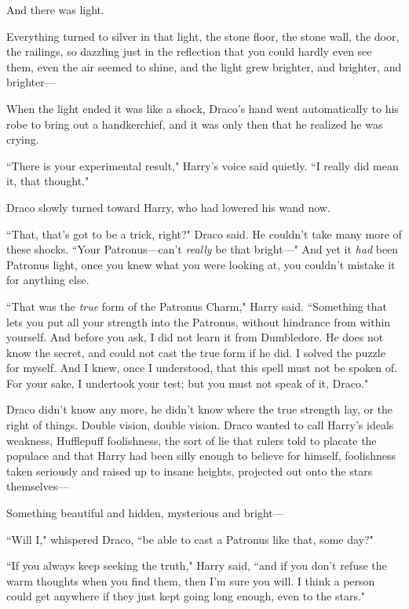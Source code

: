 And there was light.

Everything turned to silver in that light, the stone floor, the stone wall, the door, the railings, so dazzling just in the reflection that you could hardly even see them, even the air seemed to shine, and the light grew brighter, and brighter, and brighter—

When the light ended it was like a shock, Draco's hand went automatically to his robe to bring out a handkerchief, and it was only then that he realized he was crying.

``There is your experimental result," Harry's voice said quietly. ``I really did mean it, that thought."

Draco slowly turned toward Harry, who had lowered his wand now.

``That, that's got to be a trick, right?" Draco said. He couldn't take many more of these shocks. ``Your Patronus—can't \emph{really} be that bright—" And yet it \emph{had} been Patronus light, once you knew what you were looking at, you couldn't mistake it for anything else.

``That was the \emph{true} form of the Patronus Charm," Harry said. ``Something that lets you put all your strength into the Patronus, without hindrance from within yourself. And before you ask, I did not learn it from Dumbledore. He does not know the secret, and could not cast the true form if he did. I solved the puzzle for myself. And I knew, once I understood, that this spell must not be spoken of. For your sake, I undertook your test; but you must not speak of it, Draco."

Draco didn't know any more, he didn't know where the true strength lay, or the right of things. Double vision, double vision. Draco wanted to call Harry's ideals weakness, Hufflepuff foolishness, the sort of lie that rulers told to placate the populace and that Harry had been silly enough to believe for himself, foolishness taken seriously and raised up to insane heights, projected out onto the stars themselves—

Something beautiful and hidden, mysterious and bright—

``Will I," whispered Draco, ``be able to cast a Patronus like that, some day?"

``If you always keep seeking the truth," Harry said, ``and if you don't refuse the warm thoughts when you find them, then I'm sure you will. I think a person could get anywhere if they just kept going long enough, even to the stars."

